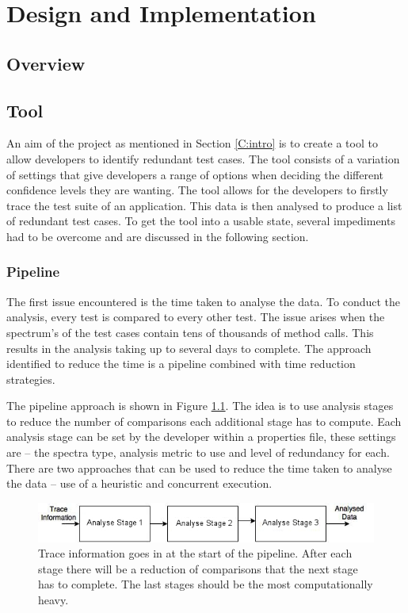 \chapter{Design and Implementation}\label{C:workdone}

\section{Overview}


\section{Tool}
\label{S:framework}
An aim of the project as mentioned in Section \ref{C:intro} is to create a tool to allow developers to identify redundant test cases. The tool consists of a variation of settings that give developers a range of options when deciding the different confidence levels they are wanting. The tool allows for the developers to firstly trace the test suite of an application. This data is then analysed to produce a list of redundant test cases. To get the tool into a usable state, several impediments had to be overcome and are discussed in the following section. 

\subsection{Pipeline}
The first issue encountered is the time taken to analyse the data. To conduct the analysis, every test is compared to every other test. The issue arises when the spectrum's of the test cases contain tens of thousands of method calls. This results in the analysis taking up to several days to complete. The approach identified to reduce the time is a pipeline combined with time reduction strategies.

The pipeline approach is shown in Figure \ref{fig:pipeline}. The idea is to use analysis stages to reduce the number of comparisons each additional stage has to compute. Each analysis stage can be set by the developer within a properties file, these settings are -- the spectra type, analysis metric to use and level of redundancy for each. There are two approaches that can be used to reduce the time taken to analyse the data -- use of a heuristic and concurrent execution.

\begin{figure}[h]
\includegraphics[width=\textwidth]{Pipeline.jpg}
\caption{Trace information goes in at the start of the pipeline. After each stage there will be a reduction of comparisons that the next stage has to complete. The last stages should be the most computationally heavy.}
\label{fig:pipeline}
\end{figure}

